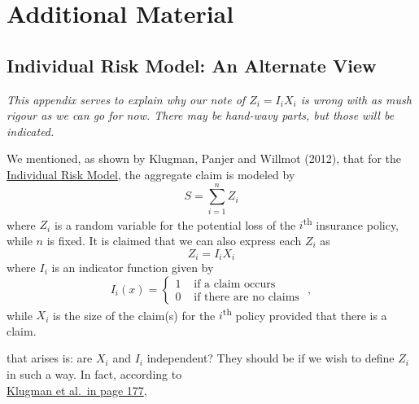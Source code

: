 \documentclass[notoc,notitlepage]{tufte-book}
\begin{document}




\appendix

\chapter{Additional Material}%
\label{chp:additional_material}

\section{Individual Risk Model: An Alternate View}%
\label{sec:individual_risk_model_an_alternate_view}

\textit{This appendix serves to explain why our note of $Z_i = I_i X_i$ is wrong with as mush rigour as we can go for now. There may be hand-wavy parts, but those will be indicated.} 

We mentioned, as shown by Klugman, Panjer and Willmot (2012)\cite{KlugmanPanjerWillmot2012}, that for the \hyperref[defn:individual_risk_model]{Individual Risk Model}, the aggregate claim is modeled by
\begin{equation*}
  S = \sum_{i=1}^{n} Z_i
\end{equation*}
where $Z_i$ is a random variable for the potential loss of the $i$\textsuperscript{th} insurance policy, while $n$ is fixed. It is claimed that we can also express each $Z_i$ as
\begin{equation*}
  Z_i = I_i X_i
\end{equation*}
where $I_i$ is an indicator function given by
\begin{equation*}
  I_i(x) = \begin{cases}
    1 & \text{ if a claim occurs } \\
    0 & \text{ if there are no claims }
  \end{cases},
\end{equation*}
while $X_i$ is the size of the claim(s) for the $i$\textsuperscript{th} policy provided that there is a claim.

 that arises is: are $X_i$ and $I_i$ independent? They should be if we wish to define $Z_i$ in such a way. In fact, according to \\
\noindent\textcolor{be-magenta}{\underline{Klugman et al.\ in page 177}},
\end{document}
